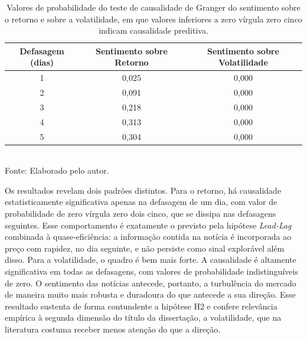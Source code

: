 \begin{table}[htpb]
\centering
\caption{Valores de probabilidade do teste de causalidade de Granger do sentimento sobre o retorno e sobre a volatilidade, em que valores inferiores a zero vírgula zero cinco indicam causalidade preditiva.}
\label{tab:granger}
\begin{tabular}{ccc}
\hline
\textbf{Defasagem (dias)} & \textbf{Sentimento sobre Retorno} & \textbf{Sentimento sobre Volatilidade} \\ \hline
1 & 0,025 & 0,000 \\
2 & 0,091 & 0,000 \\
3 & 0,218 & 0,000 \\
4 & 0,313 & 0,000 \\
5 & 0,304 & 0,000 \\ \hline
\end{tabular}
\vspace{0.2cm}
{\small \\ Fonte: Elaborado pelo autor.}
\end{table}

Os resultados revelam dois padrões distintos. Para o retorno, há causalidade estatisticamente significativa apenas na defasagem de um dia, com valor de probabilidade de zero vírgula zero dois cinco, que se dissipa nas defasagens seguintes. Esse comportamento é exatamente o previsto pela hipótese \textit{Lead-Lag} combinada à quase-eficiência: a informação contida na notícia é incorporada ao preço com rapidez, no dia seguinte, e não persiste como sinal explorável além disso. Para a volatilidade, o quadro é bem mais forte. A causalidade é altamente significativa em todas as defasagens, com valores de probabilidade indistinguíveis de zero. O sentimento das notícias antecede, portanto, a turbulência do mercado de maneira muito mais robusta e duradoura do que antecede a sua direção. Esse resultado sustenta de forma contundente a hipótese H2 e confere relevância empírica à segunda dimensão do título da dissertação, a volatilidade, que na literatura costuma receber menos atenção do que a direção.

